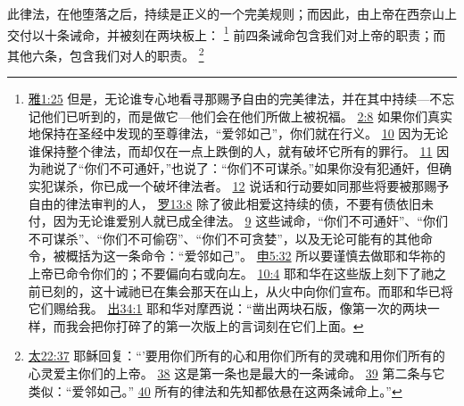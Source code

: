 \documentclass[12pt, a4paper, oneside]{ctexart}
\newcounter{parnum}[section]
\newcommand{\N}{%
   \noindent\refstepcounter{parnum}%
    \makebox[\parindent][l]{\textbf{\arabic{parnum}.}}}
\begin{document}
\N 此律法，在他堕落之后，持续是正义的一个完美规则；而因此，由上帝在西奈山上交付以十条诫命，并被刻在两块板上：
	\footnote {
		\href{https://biblehub.com/james/1-25.htm}{雅1:25} 但是，无论谁专心地看寻那赐予自由的完美律法，并在其中持续---不忘记他们已听到的，而是做它---他们会在他们所做上被祝福。
		\href{https://biblehub.com/james/2-8.htm}{2:8} 如果你们真实地保持在圣经中发现的至尊律法，“爱邻如己”，你们就在行义。
		\href{https://biblehub.com/james/2-10.htm}{10} 因为无论谁保持整个律法，而却仅在一点上跌倒的人，就有破坏它所有的罪行。
		\href{https://biblehub.com/james/2-11.htm}{11} 因为祂说了“你们不可通奸，”也说了：“你们不可谋杀。”如果你没有犯通奸，但确实犯谋杀，你已成一个破坏律法者。
		\href{https://biblehub.com/james/2-12.htm}{12} 说话和行动要如同那些将要被那赐予自由的律法审判的人，
        \href{https://biblehub.com/romans/13-8.htm}{罗13:8} 除了彼此相爱这持续的债，不要有债依旧未付，因为无论谁爱别人就已成全律法。
		\href{https://biblehub.com/romans/13-9.htm}{9} 这些诫命，“你们不可通奸”、“你们不可谋杀”、“你们不可偷窃”、“你们不可贪婪”，以及无论可能有的其他命令，被概括为这一条命令：“爱邻如己”。
		\href{https://biblehub.com/deuteronomy/5-32.htm}{申5:32} 所以要谨慎去做耶和华祢的上帝已命令你们的；不要偏向右或向左。
		\href{https://biblehub.com/deuteronomy/10-4.htm}{10:4} 耶和华在这些版上刻下了祂之前已刻的，这十诫祂已在集会那天在山上，从火中向你们宣布。而耶和华已将它们赐给我。
        \href{https://biblehub.com/exodus/34-1.htm}{出34:1} 耶和华对摩西说：“凿出两块石版，像第一次的两块一样，而我会把你打碎了的第一次版上的言词刻在它们上面。
	}
	前四条诫命包含我们对上帝的职责；而其他六条，包含我们对人的职责。
	\footnote {
		\href{https://biblehub.com/matthew/22-37.htm}{太22:37} 耶稣回复：“'要用你们所有的心和用你们所有的灵魂和用你们所有的心灵爱主你们的上帝。
		\href{https://biblehub.com/matthew/22-38.htm}{38} 这是第一条也是最大的一条诫命。
		\href{https://biblehub.com/matthew/22-39.htm}{39} 第二条与它类似：“爱邻如己。”
		\href{https://biblehub.com/matthew/22-40.htm}{40} 所有的律法和先知都依悬在这两条诫命上。”
	}
\end{document}
